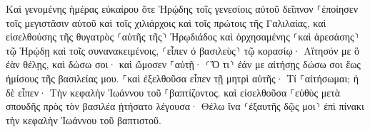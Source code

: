 \documentclass{openreader}
\begin{document}
Καὶ γενομένης ἡμέρας εὐκαίρου ὅτε Ἡρῴδης τοῖς γενεσίοις αὐτοῦ δεῖπνον ⸀ἐποίησεν τοῖς μεγιστᾶσιν αὐτοῦ καὶ τοῖς χιλιάρχοις καὶ τοῖς πρώτοις τῆς Γαλιλαίας, 
καὶ εἰσελθούσης τῆς θυγατρὸς ⸂αὐτῆς τῆς⸃ Ἡρῳδιάδος καὶ ὀρχησαμένης ⸂καὶ ἀρεσάσης⸃ τῷ Ἡρῴδῃ καὶ τοῖς συνανακειμένοις, ⸂εἶπεν ὁ βασιλεὺς⸃ τῷ κορασίῳ· Αἴτησόν με ὃ ἐὰν θέλῃς, καὶ δώσω σοι· 
καὶ ὤμοσεν ⸀αὐτῇ· ⸂Ὅ τι⸃ ἐάν με αἰτήσῃς δώσω σοι ἕως ἡμίσους τῆς βασιλείας μου. 
⸀καὶ ἐξελθοῦσα εἶπεν τῇ μητρὶ αὐτῆς· Τί ⸀αἰτήσωμαι; ἡ δὲ εἶπεν· Τὴν κεφαλὴν Ἰωάννου τοῦ ⸀βαπτίζοντος. 
καὶ εἰσελθοῦσα ⸀εὐθὺς μετὰ σπουδῆς πρὸς τὸν βασιλέα ᾐτήσατο λέγουσα· Θέλω ἵνα ⸂ἐξαυτῆς δῷς μοι⸃ ἐπὶ πίνακι τὴν κεφαλὴν Ἰωάννου τοῦ βαπτιστοῦ. 
\end{document}
